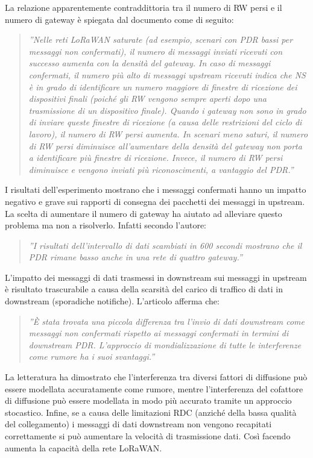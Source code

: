 \documentclass[a4paper]{report} %
\begin{document}
La relazione apparentemente contraddittoria tra il numero di RW persi e il numero di gateway è spiegata dal documento \cite{art:rif.49} come di seguito:
\begin{quote}	
	\textit{''Nelle reti LoRaWAN saturate (ad esempio, scenari con PDR bassi per messaggi non confermati), il numero di messaggi inviati ricevuti con successo aumenta con la densità del gateway. In caso di messaggi confermati, il numero più alto di messaggi upstream ricevuti indica che NS è in grado di identificare un numero maggiore di finestre di ricezione dei dispositivi finali (poiché gli RW vengono sempre aperti dopo una trasmissione di un dispositivo finale). Quando i gateway non sono in grado di inviare queste finestre di ricezione (a causa delle restrizioni del ciclo di lavoro), il numero di RW persi aumenta. In scenari meno saturi, il numero di RW persi diminuisce all'aumentare della densità del gateway non porta a identificare più finestre di ricezione. Invece, il numero di RW persi diminuisce e vengono inviati più riconoscimenti, a vantaggio del PDR.''}
\end{quote}
I risultati dell'esperimento \cite{art:rif.49} mostrano che i messaggi confermati hanno un impatto negativo e grave sui rapporti di consegna dei pacchetti dei messaggi in upstream. La scelta di aumentare il numero di gateway ha aiutato ad alleviare questo problema ma non a risolverlo. Infatti secondo l'autore:
\begin{quote}
	\textit{''I risultati dell'intervallo di dati scambiati in 600 secondi mostrano che il PDR rimane basso anche in una rete di quattro gateway.''}
\end{quote}
L'impatto dei messaggi di dati trasmessi in downstream sui messaggi in upstream è risultato trascurabile a causa della scarsità del carico di traffico di dati in downstream (sporadiche notifiche). L'articolo \cite{art:rif.49} afferma che:
\begin{quote}
	\textit{''È stata trovata una piccola differenza tra l'invio di dati downstream come messaggi non confermati rispetto ai messaggi confermati in termini di downstream PDR. L'approccio di mondializzazione di tutte le interferenze come rumore ha i suoi svantaggi.''}
\end{quote}
La letteratura ha dimostrato che l'interferenza tra diversi fattori di diffusione può essere modellata accuratamente come rumore, mentre l'interferenza del cofattore di diffusione può essere modellata in modo più accurato tramite un approccio stocastico.
Infine, se a causa delle limitazioni RDC (anziché della bassa qualità del collegamento) i messaggi di dati downstream non vengono recapitati correttamente si può aumentare la velocità di trasmissione dati. Così facendo aumenta la capacità della rete LoRaWAN. 
\end{document}
